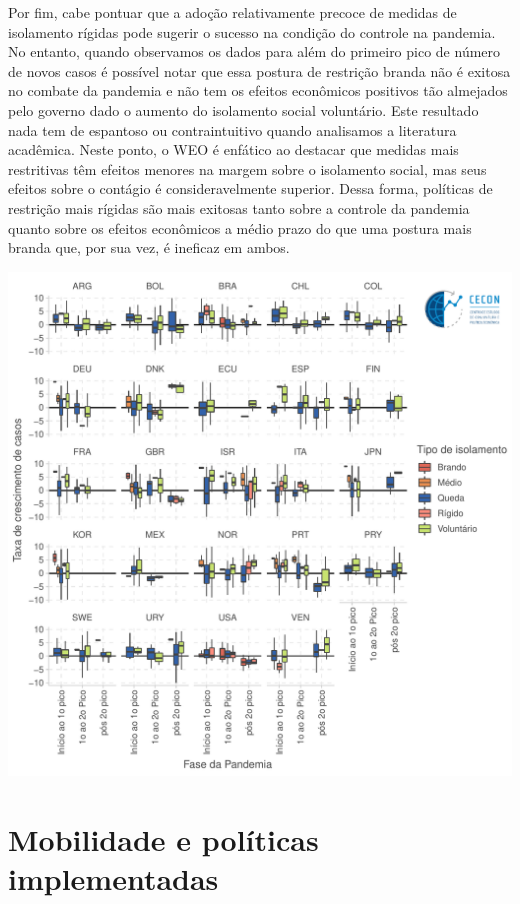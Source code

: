 \documentclass{SelfArx}
\begin{document}
Por fim, cabe pontuar que a adoção relativamente precoce de medidas de isolamento rígidas pode sugerir o sucesso na condição do controle na pandemia.
No entanto, quando observamos os dados para além do primeiro pico de número de novos casos é possível notar que essa postura de restrição branda não é exitosa no combate da pandemia e não tem os efeitos econômicos positivos tão almejados pelo governo dado o aumento do isolamento social voluntário.
Este resultado nada tem de espantoso ou contraintuitivo quando analisamos a literatura acadêmica.
Neste ponto, o WEO é enfático ao destacar que medidas mais restritivas têm efeitos menores na margem sobre o isolamento social, mas seus efeitos sobre o contágio é consideravelmente superior.
Dessa forma, políticas de restrição mais rígidas são mais exitosas tanto sobre a controle da pandemia quanto sobre os efeitos econômicos a médio prazo do que uma postura mais branda que, por sua vez, é ineficaz em ambos.

\begin{center}
\includegraphics[width=.9\linewidth]{./figs/COVID/Casos_Policy_LowHigh.pdf}
\end{center}

\section*{Mobilidade e políticas implementadas}
\label{sec:orge3a4aa2}
\end{document}
